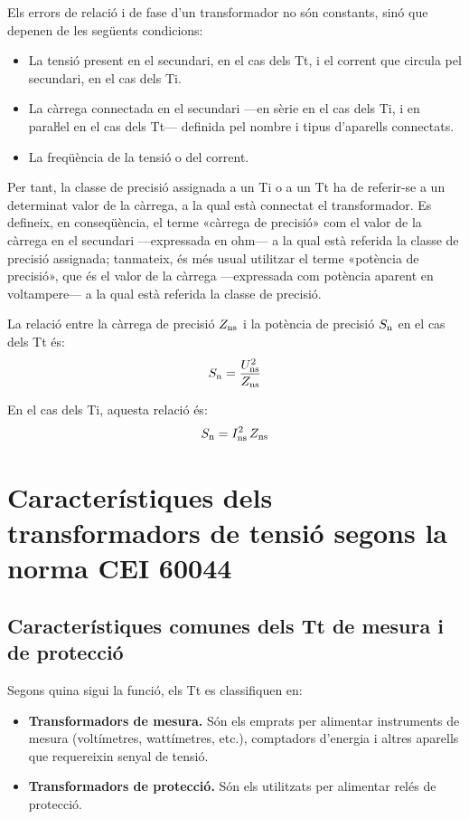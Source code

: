 Els errors de relació i de fase d'un transformador no són
constants, sinó que depenen de les següents condicions:
\begin{itemize}
   \item La tensió present en el secundari, en el cas dels Tt, i el corrent que
   circula    pel secundari, en el cas dels Ti.
   \item La càrrega connectada en el secundari ---en sèrie en el cas dels Ti,
   i en paraŀlel en el cas dels Tt--- definida pel nombre i tipus d'aparells connectats.
   \item La freqüència de la tensió o del corrent.
\end{itemize}

Per tant, la classe de precisió assignada a un Ti o a un Tt ha de
referir-se a un determinat valor de la càrrega, a la qual està
connectat el transformador. Es defineix, en conseqüència, el terme
«càrrega de precisió» com el valor de la càrrega en el secundari
---expressada en ohm--- a la qual està referida la classe de precisió
assignada; tanmateix, és més usual  utilitzar el terme «potència
de precisió», que és el valor de la càrrega ---expressada com potència aparent en voltampere---
 a la qual està referida la classe de precisió.

La relació entre la càrrega de precisió $Z_\mathrm{ns}$ i la potència de
precisió $S_\mathrm{n}$ en el cas dels Tt és:
\begin{equation}
    S_\mathrm{n} = \frac{U_\mathrm{ns}^2}{Z_\mathrm{ns}}
\end{equation}

En el cas dels Ti, aquesta relació és:
\begin{equation}\label{eq:sn_ti}
    S_\mathrm{n} = I_\mathrm{ns}^2 \,Z_\mathrm{ns}
\end{equation}


\section{Característiques dels transformadors de tensió segons la norma CEI 60044}

\subsection{Característiques comunes dels Tt de mesura i de protecció}

Segons quina sigui la  funció, els Tt es classifiquen en:
\begin{itemize}
	\item \textbf{Transformadors de mesura.} Són els emprats per alimentar
	instruments de mesura (voltímetres, wattímetres, etc.),         comptadors d'energia i altres aparells que requereixin senyal de tensió.
	\item \textbf{Transformadors de protecció.}  Són els utilitzats per
	alimentar relés de protecció.
\end{itemize}

